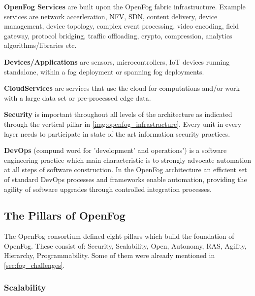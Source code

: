 \textbf{OpenFog Services} are built upon the OpenFog fabric infrastructure. Example services are network accerleration, NFV, SDN, content delivery, device management, device topology, complex event processing, video encoding, field gateway, protocol bridging, traffic offloading, crypto, compression, analytics algorithms/libraries etc.\cite[p. 8]{OpenFog}

\textbf{Devices/Applications} are sensors, microcontrollers, IoT devices running standalone, within a fog deployment or spanning fog deployments.\cite[p. 8]{OpenFog}
 
\textbf{CloudServices} are services that use the cloud for computations and/or work with a large data set or pre-processed edge data.\cite[p. 8]{OpenFog}

\textbf{Security} is important throughout all levels of the architecture as indicated through the vertical pillar in \autoref{img:openfog_infrastracture}. Every unit in every layer needs to participate in state of the art information security practices.\cite[p. 8]{OpenFog}

\textbf{DevOps} (compund word for 'development' and operations') is a software engineering practice which main characteristic is to strongly advocate automation at all steps of software construction. In the OpenFog architecture an efficient set of standard DevOps processes and frameworks enable automation, providing the agility of software upgrades through controlled integration processes.\cite[p. 9]{OpenFog}

\subsection{The Pillars of OpenFog}


The OpenFog consortium defined eight pillars which build the foundation of OpenFog. These consist of: Security, Scalability, Open, Autonomy, RAS, Agility, Hierarchy, Programmability. Some of them were already mentioned in \autoref{sec:fog_challenges}.

\subsubsection{Scalability}

